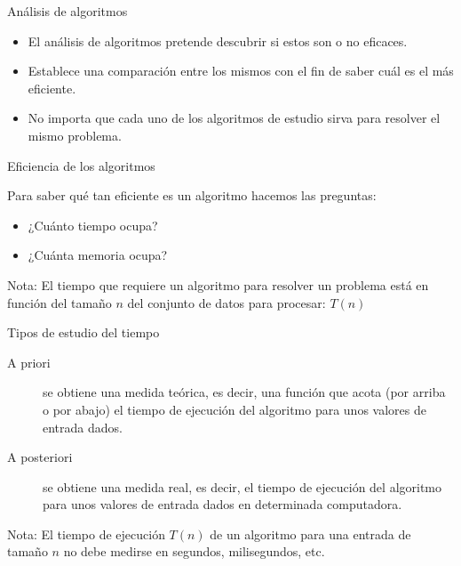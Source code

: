 \begin{frame}[c]{Análisis de algoritmos}
  \begin{itemize}
    \item El análisis de algoritmos pretende descubrir si estos son o no
      eficaces.
    \pausa
    \item Establece una comparación entre los mismos con el fin de saber
      cuál es el más eficiente.
    \pausa
    \item No importa que cada uno de los algoritmos de estudio sirva para
      resolver el mismo problema.
  \end{itemize}
\end{frame}

\begin{frame}[c]{Eficiencia de los algoritmos}

  Para saber qué tan eficiente es un algoritmo hacemos las preguntas:
  \vspace{\baselineskip}

  \pausa
  \begin{itemize}
    \item ¿Cuánto tiempo ocupa?
    \pausa
    \item ¿Cuánta memoria ocupa?
  \end{itemize}
  \pausa
  \begin{block}{Nota:}
    El tiempo que requiere un algoritmo para resolver un problema está
    en función del tamaño $n$ del conjunto de datos para procesar: $T(n)$
  \end{block}
\end{frame}

\begin{frame}[c]{Tipos de estudio del tiempo}
  \begin{description}
    \item[A priori] se obtiene una medida teórica, es decir, una función
      que acota (por arriba o por abajo) el tiempo de ejecución del
      algoritmo para unos valores de entrada dados.
    \pausa
    \item[A posteriori] se obtiene una medida real, es decir, el tiempo
      de ejecución del algoritmo para unos valores de entrada dados en
      determinada computadora.
  \end{description}
  \pausa
  \begin{alertblock}{Nota:}
    El tiempo de ejecución $T(n)$ de un algoritmo para una entrada de
    tamaño $n$ no debe medirse en segundos, milisegundos, etc.
  \end{alertblock}
\end{frame}


